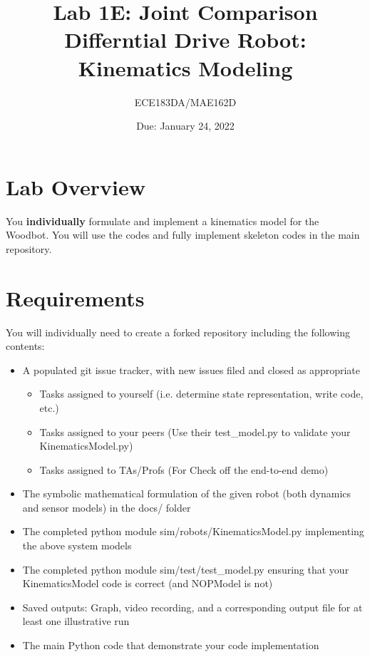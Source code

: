 \documentclass[letterpaper,11pt]{article}
\begin{document}
\title{Lab 1E: Joint Comparison \\\textbf{Differntial Drive Robot: Kinematics Modeling}}
\author{ECE183DA/MAE162D}
\date{Due: January 24, 2022}
\maketitle


\section{Lab Overview}
You \textbf{individually} formulate and implement a kinematics model for the Woodbot. You will use the codes and fully implement skeleton codes in the main repository. 

\section{Requirements}
You will individually need to create a forked repository including the following contents: 
\begin{itemize}
    \item A populated git issue tracker, with new issues filed and closed as appropriate
    \begin{itemize}
        \item Tasks assigned to yourself (i.e. determine state representation, write code, etc.)
        \item Tasks assigned to your peers (Use their test\_model.py to validate your KinematicsModel.py)
        \item Tasks assigned to TAs/Profs (For Check off the end-to-end demo)
    \end{itemize}
    \item The symbolic mathematical formulation of the given robot (both dynamics and sensor models) in the docs/ folder
    \item The completed python module sim/robots/KinematicsModel.py implementing the above system models
    \item The completed python module sim/test/test\_model.py ensuring that your KinematicsModel code is correct (and NOPModel is not)
    \item Saved outputs: Graph, video recording, and a corresponding output file for at least one illustrative run
    \item The main Python code that demonstrate your code implementation
\end{itemize}
\end{document}
